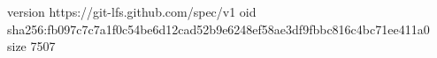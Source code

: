 version https://git-lfs.github.com/spec/v1
oid sha256:fb097c7c7a1f0c54be6d12cad52b9e6248ef58ae3df9fbbc816c4bc71ee411a0
size 7507

